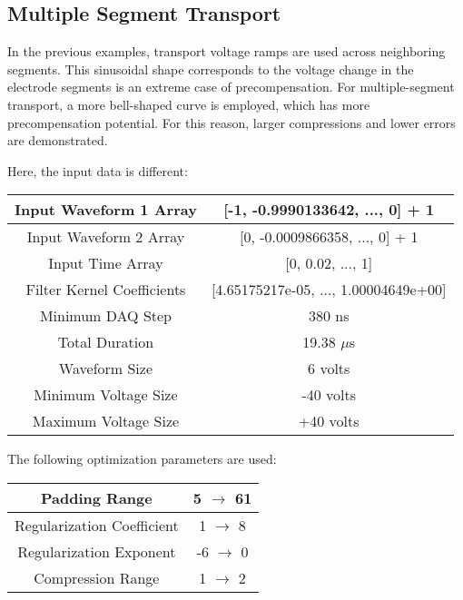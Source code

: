 \documentclass[11pt, a4paper]{article}
\theoremstyle{definition}
\numberwithin{equation}{section}
\begin{document}
\subsection{Multiple Segment Transport}
In the previous examples, transport voltage ramps are used across neighboring segments. This sinusoidal shape corresponds to the voltage change in the electrode segments is an extreme case of precompensation. For multiple-segment transport, a more bell-shaped curve is employed, which has more precompensation potential. For this reason, larger compressions and lower errors are demonstrated.

Here, the input data is different:

\begin{center}
\begin{tabular}{ | c | c | } 
  \hline
   Input Waveform 1 Array & [-1, -0.9990133642, ..., 0] + 1 \\ 
  \hline
  Input Waveform 2 Array & [0, -0.0009866358, ..., 0] + 1 \\ 
  \hline
  Input Time Array & [0, 0.02, ..., 1] \\ 
  \hline
  Filter Kernel Coefficients & [4.65175217e-05, ..., 1.00004649e+00] \\ 
  \hline
  Minimum DAQ Step & 380 ns \\ 
  \hline
  Total Duration & 19.38 $\mu$s \\ 
  \hline
  Waveform Size & 6 volts \\ 
  \hline
  Minimum Voltage Size & -40 volts \\ 
  \hline
  Maximum Voltage Size & +40 volts \\ 
  \hline
\end{tabular}
\end{center}

The following optimization parameters are used:

\begin{center}
\begin{tabular}{ | c | c | } 
  \hline
   Padding Range & 5 $\rightarrow$ 61 \\ 
  \hline
  Regularization Coefficient & 1 $\rightarrow$ 8 \\ 
  \hline
  Regularization Exponent & -6 $\rightarrow$ 0 \\ 
  \hline
  Compression Range & 1 $\rightarrow$ 2 \\ 
  \hline
\end{tabular}
\end{center}
\end{document}
